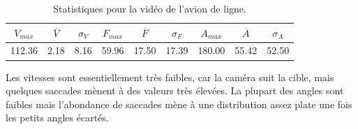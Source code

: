 \begin{table}
	\centering
	\begin{tabular}{c c c c c c c c c}
		$V_{max}$	& $\overline{V}$	& $\sigma_{V}$	& $F_{max}$	& $\overline{F}$	& $\sigma_{F}$	& $A_{max}$	& $\overline{A}$	& $\sigma_{A}$	\bigstrut[b] \\ \hline

		112.36		& 2.18				& 8.16			& 59.96		& 17.50				& 17.39			& 180.00	& 55.42				& 52.50			\bigstrut[t] \\
	\end{tabular}
	\caption[Statistiques pour de l'avion de ligne]{Statistiques pour la vidéo de l'avion de ligne.}
	\label{tab:chinaA_stats}
\end{table}
	
	Les vitesses sont essentiellement très faibles, car la caméra suit la cible, mais quelques saccades mènent à des valeurs très élevées. La plupart des angles sont faibles mais l'abondance de saccades mène à une distribution assez \og plate \fg{} une fois les petits angles écartés.

